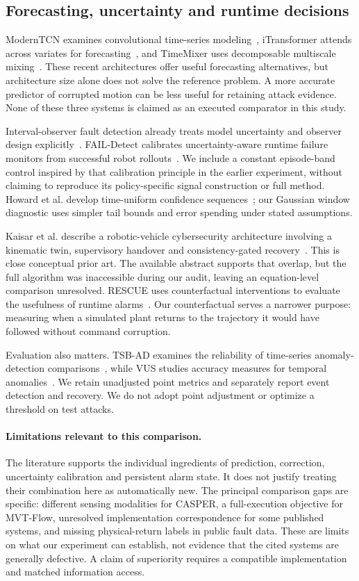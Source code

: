 \documentclass[11pt]{article}
\begin{document}
\subsection{Forecasting, uncertainty and runtime decisions}
ModernTCN examines convolutional time-series modeling~\cite{moderntcn}, iTransformer attends across variates for forecasting~\cite{itransformer}, and TimeMixer uses decomposable multiscale mixing~\cite{timemixer}. These recent architectures offer useful forecasting alternatives, but architecture size alone does not solve the reference problem. A more accurate predictor of corrupted motion can be less useful for retaining attack evidence. None of these three systems is claimed as an executed comparator in this study.

Interval-observer fault detection already treats model uncertainty and observer design explicitly~\cite{interval}. FAIL-Detect calibrates uncertainty-aware runtime failure monitors from successful robot rollouts~\cite{fail}. We include a constant episode-band control inspired by that calibration principle in the earlier experiment, without claiming to reproduce its policy-specific signal construction or full method. Howard et al. develop time-uniform confidence sequences~\cite{howard}; our Gaussian window diagnostic uses simpler tail bounds and error spending under stated assumptions.

Kaisar et al. describe a robotic-vehicle cybersecurity architecture involving a kinematic twin, supervisory handover and consistency-gated recovery~\cite{kaisar}. This is close conceptual prior art. The available abstract supports that overlap, but the full algorithm was inaccessible during our audit, leaving an equation-level comparison unresolved. RESCUE uses counterfactual interventions to evaluate the usefulness of runtime alarms~\cite{rescue}. Our counterfactual serves a narrower purpose: measuring when a simulated plant returns to the trajectory it would have followed without command corruption.

Evaluation also matters. TSB-AD examines the reliability of time-series anomaly-detection comparisons~\cite{tsbad}, while VUS studies accuracy measures for temporal anomalies~\cite{vus}. We retain unadjusted point metrics and separately report event detection and recovery. We do not adopt point adjustment or optimize a threshold on test attacks.

\paragraph{Limitations relevant to this comparison.}
The literature supports the individual ingredients of prediction, correction, uncertainty calibration and persistent alarm state. It does not justify treating their combination here as automatically new. The principal comparison gaps are specific: different sensing modalities for CASPER, a full-execution objective for MVT-Flow, unresolved implementation correspondence for some published systems, and missing physical-return labels in public fault data. These are limits on what our experiment can establish, not evidence that the cited systems are generally defective. A claim of superiority requires a compatible implementation and matched information access.
\end{document}
